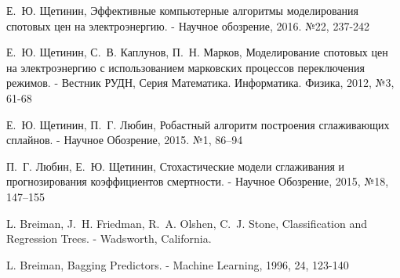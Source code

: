 \documentclass[60x84/16,8pt]{ittmm}
\begin{document}
\begin{thebibliography}{99}

Е.~Ю. Щетинин, Эффективные компьютерные алгоритмы моделирования спотовых цен на
электроэнергию. - Научное обозрение, 2016. №22, 237-242

Е.~Ю. Щетинин, С.~В. Каплунов, П.~Н. Марков, Моделирование спотовых цен на
электроэнергию с использованием марковских процессов переключения режимов. -
Вестник РУДН, Серия Математика. Информатика. Физика, 2012, №3, 61-68

Е.~Ю. Щетинин, П.~Г. Любин, Робастный алгоритм построения сглаживающих сплайнов.
- Научное Обозрение, 2015. №1, 86–94

П.~Г. Любин, Е.~Ю. Щетинин, Стохастические модели сглаживания и прогнозирования
коэффициентов смертности. - Научное Обозрение, 2015, №18, 147–155

L. Breiman, J.~H. Friedman, R.~A. Olshen, C.~J. Stone, Classification and
Regression Trees. - Wadsworth, California.

L. Breiman, Bagging Predictors. - Machine Learning, 1996, 24, 123-140

\end{thebibliography}


% 
% 


\makealttitle      
\end{document}
